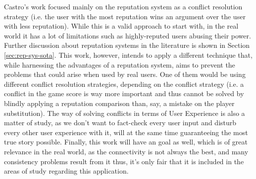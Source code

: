 Castro's work focused mainly on the reputation system as a conflict resolution strategy (i.e. the user with the most reputation wins an argument over the user with less reputation). While this is a valid approach to start with, in the real world it has a lot of limitations such as highly-reputed users abusing their power. Further discussion about reputation systems in the literature is shown in Section \ref{sec:rep-sys-sota}. This work, however, intends to apply a different technique that, while harnessing the advantages of a reputation system, aims to prevent the problems that could arise when used by real users. One of them would be using different conflict resolution strategies, depending on the conflict strategy (i.e. a conflict in the game score is way more important and thus cannot be solved by blindly applying a reputation comparison than, say, a mistake on the player substitution). The way of solving conflicts in terms of User Experience is also a matter of study, as we don't want to fact-check every user input and disturb every other user experience with it, will at the same time guaranteeing the most true story possible. Finally, this work will have an  goal as well, which is of great relevance in the real world, as the connectivity is not always the best, and many consistency problems result from it thus, it's only fair that it is included in the areas of study regarding this application.